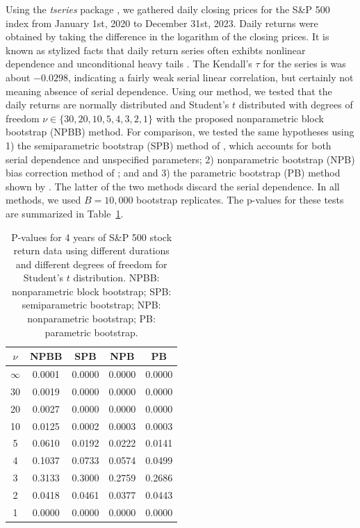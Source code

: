 \documentclass[12pt, titlepage, letterpaper]{article}
\begin{document}
Using the \textsl{tseries} package \citep{tseries}, 
we gathered daily closing prices for the S\&P 500 index from January 1st, 2020
to December 31st, 2023. Daily returns were obtained by taking the difference in
the logarithm of the closing prices. 
It is known as stylized facts that daily return series often exhibts nonlinear
dependence and unconditional heavy tails \citep[e.g.,][]{ryden1998stylized,
  cont2001empirical}. The Kendall's $\tau$ for the series is
was about $-0.0298$, indicating a fairly weak serial linear correlation, but
certainly not meaning absence of serial dependence.
Using our method, we tested that the daily returns are normally
distributed and Student's $t$ distributed 
with degrees of freedom $\nu \in \{30, 20, 10, 5, 4, 3, 2, 1\}$
with the proposed nonparametric block bootstrap (NPBB) method.
For comparison, we tested the same hypotheses using 1) the
semiparametric bootstrap (SPB) method of \citet{zeimbekakis2022misuses},
which accounts for both serial dependence and unspecified parameters;
2) nonparametric bootstrap (NPB) bias correction method of
\citet{babu2004goodness}; and and 3) the parametric bootstrap (PB) method shown
by \citet{zeimbekakis2022misuses}. The latter of the two methods discard the
serial dependence. In all methods, we used $B = 10,000$ bootstrap replicates.
The p-values for these tests are summarized in 
Table~\ref{table:SP5004}.

\begin{table}[ht]
\centering
\caption{P-values for 4 years of S\&P 500 stock return 
  data using different durations
  and different degrees of freedom for Student's $t$ distribution.
  NPBB: nonparametric block bootstrap;
  SPB: semiparametric bootstrap;
  NPB: nonparametric bootstrap;
  PB: parametric bootstrap.} 
\label{table:SP5004}
\begin{tabular}{ccccc}
  \toprule
$\nu$ & NPBB & SPB & NPB & PB\\ 
  \midrule
$\infty$ & 0.0001 & 0.0000 & 0.0000 & 0.0000 \\ 
  30 & 0.0019 & 0.0000 & 0.0000 & 0.0000 \\ 
  20 & 0.0027 & 0.0000 & 0.0000 & 0.0000 \\ 
  10 & 0.0125 & 0.0002 & 0.0003 & 0.0003 \\ 
  5 & 0.0610 & 0.0192 & 0.0222 & 0.0141 \\ 
  4 & 0.1037 & 0.0733 & 0.0574 & 0.0499 \\ 
  3 & 0.3133 & 0.3000 & 0.2759 & 0.2686 \\ 
  2 & 0.0418 & 0.0461 & 0.0377 & 0.0443 \\ 
  1 & 0.0000 & 0.0000 & 0.0000 & 0.0000 \\ 
  \bottomrule
\end{tabular}
\end{table}
\end{document}
